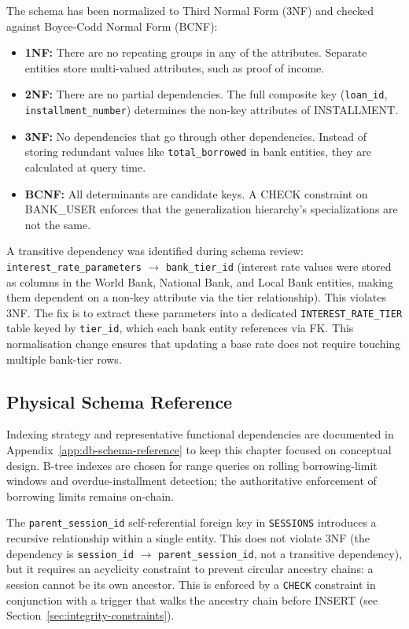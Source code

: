 \documentclass[12pt, a4paper]{report}
\begin{document}
The schema has been normalized to Third Normal Form (3NF) and checked against Boyce-Codd Normal Form (BCNF):

\begin{itemize}[noitemsep]
\item \textbf{1NF:} There are no repeating groups in any of the attributes. Separate entities store multi-valued attributes, such as proof of income.
\item \textbf{2NF:} There are no partial dependencies. The full composite key (\texttt{loan\_id}, \texttt{installment\_number}) determines the non-key attributes of INSTALLMENT.
\item \textbf{3NF:} No dependencies that go through other dependencies. Instead of storing redundant values like \texttt{total\_borrowed} in bank entities, they are calculated at query time.
\item \textbf{BCNF:} All determinants are candidate keys. A CHECK constraint on BANK\_USER enforces that the generalization hierarchy's specializations are not the same.
\end{itemize}

\label{sec:normalization}
A transitive dependency was identified during schema review: \texttt{interest\_rate\_parameters} $\to$ \texttt{bank\_tier\_id} (interest rate values were stored as columns in the World Bank, National Bank, and Local Bank entities, making them dependent on a non-key attribute via the tier relationship). This violates 3NF. The fix is to extract these parameters into a dedicated \texttt{INTEREST\_RATE\_TIER} table keyed by \texttt{tier\_id}, which each bank entity references via FK. This normalisation change ensures that updating a base rate does not require touching multiple bank-tier rows.

\subsection{Physical Schema Reference}

Indexing strategy and representative functional dependencies are documented in Appendix~\ref{app:db-schema-reference} to keep this chapter focused on conceptual design. B-tree indexes are chosen for range queries on rolling borrowing-limit windows and overdue-installment detection; the authoritative enforcement of borrowing limits remains on-chain.

\noindent The \texttt{parent\_session\_id} self-referential foreign key in
\texttt{SESSIONS} introduces a recursive relationship within a single entity.
This does not violate 3NF (the dependency is \texttt{session\_id} $\to$
\texttt{parent\_session\_id}, not a transitive dependency), but it requires an
acyclicity constraint to prevent circular ancestry chains: a session cannot be
its own ancestor. This is enforced by a \texttt{CHECK} constraint in conjunction
with a trigger that walks the ancestry chain before INSERT (see
Section~\ref{sec:integrity-constraints}).
\end{document}
